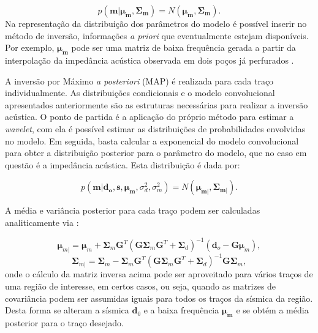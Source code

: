 \begin{equation}
\label{eq:pmodelo}
p(\boldsymbol{m}|\boldsymbol{\mu_{m}},\boldsymbol{\Sigma_{m}}) =
N(\boldsymbol{\mu_{m}},\boldsymbol{\Sigma_{m}}).
\end{equation} 
Na representação da distribuição dos parâmetros do modelo é possível inserir no método de inversão, informações \textit{a priori}
que eventualmente estejam disponíveis. Por exemplo, $\boldsymbol{\mu_{m}}$ pode ser
uma matriz de baixa frequência gerada a partir da interpolação da impedância acústica observada em dois poços
já perfurados \citep{leandroGRSL}.

A inversão por Máximo \textit{a posteriori} (MAP)
\citep{Buland01012003,leandroGRSL} é realizada para cada traço individualmente.
As distribuições condicionais e o modelo convolucional apresentados anteriormente
são as estruturas necessárias para realizar a inversão acústica. O ponto de partida
é a aplicação do próprio método para estimar a \textit{wavelet},
com ela é possível estimar as distribuições de probabilidades envolvidas no modelo.
Em seguida, basta calcular a exponencial do modelo convolucional para obter a distribuição posterior
para o parâmetro do modelo, que no caso em questão é a impedância acústica. Esta distribuição é dada por:

\begin{equation}
p(\boldsymbol{m}|\boldsymbol{d_{o}},\boldsymbol{s},\boldsymbol{\mu_{m}},\sigma_{d}^{2},\sigma_{m}^{2}) = 
N(\boldsymbol{\mu_{m|}},\boldsymbol{\Sigma_{m|}}).
\end{equation} 

A média e variância posterior para cada traço podem ser calculadas analiticamente via \citep{leandroGRSL}:

\begin{equation}
\label{eqn:mapSolution}
\boldsymbol{\mu}_{m|} = \boldsymbol{\mu}_{m} + \boldsymbol{\Sigma}_{m}\boldsymbol{G}^{T}(\boldsymbol{G\Sigma}_{m}\boldsymbol{G}^{T}+\boldsymbol{\Sigma}_{d})^{-1}\left ( \boldsymbol{d}_{o} - \boldsymbol{G\mu}_{m} \right ),
\end{equation}
\begin{equation}
\boldsymbol{\Sigma}_{m|} = \boldsymbol{\Sigma}_{m} - \boldsymbol{\Sigma}_{m}\boldsymbol{G}^{T}(\boldsymbol{G\Sigma}_{m}\boldsymbol{G}^{T}+\boldsymbol{\Sigma}_{d})^{-1}\boldsymbol{G\Sigma}_{m},
\end{equation} 
onde o cálculo da matriz inversa acima pode ser aproveitado para vários traços
de uma região de interesse, em certos casos, ou seja, quando as matrizes de
covariância podem ser assumidas iguais para todos os traços da sísmica da região.
Desta forma se alteram a sísmica $\mathbf{d}_0$ e a baixa frequência
$\boldsymbol{\mu_m}$ e se obtém a média posterior para o traço desejado.
  
